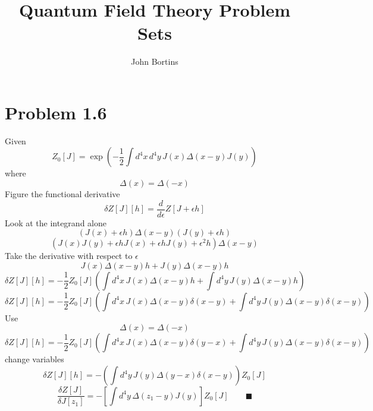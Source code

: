 \documentclass{amsart}
\title{Quantum Field Theory Problem Sets}
\author{John Bortins}
\begin{document}
 
\maketitle{}
 


\section*{Problem 1.6}
Given \[Z_0[J]=\exp\left(-\frac{1}{2}\int d^4 x\, d^4 y\, J(x) \Delta(x-y) J(y)\right)\]
where \[\Delta(x)=\Delta(-x)\]
Figure the functional derivative
\[\delta Z[J][h]=\frac{d}{d\epsilon}Z[J+\epsilon h]\]
Look at the integrand alone
\[(J(x)+\epsilon h) \Delta(x-y) (J(y)+\epsilon h)\]
\[(J(x)J(y)+\epsilon h J(x)+\epsilon h J(y)+\epsilon^2 h) \Delta(x-y)\]
Take the derivative with respect to $\epsilon$
\[J(x) \Delta(x-y)h + J(y) \Delta(x-y)h\]
\[\delta Z[J][h]=-\frac{1}{2}Z_0[J]\left(\int d^4 x\,  J(x) \Delta(x-y)h +\int d^4 y\,J(y) \Delta(x-y)h\right)\]
\[\delta Z[J][h]=-\frac{1}{2}Z_0[J]\left(\int d^4 x\,  J(x) \Delta(x-y)\delta(x-y) +\int d^4 y\,J(y) \Delta(x-y)\delta(x-y)\right)\]
Use \[\Delta(x)=\Delta(-x)\]
\[\delta Z[J][h]=-\frac{1}{2}Z_0[J]\left(\int d^4 x\,  J(x) \Delta(x-y)\delta(y-x) +\int d^4 y\,J(y) \Delta(x-y)\delta(x-y)\right)\] change variables
\[\delta Z[J][h]=-\left(\int d^4 y\,J(y) \Delta(y-x)\delta(x-y)\right)Z_0[J]\]
\[\frac{\delta Z[J]}{\delta J[z_1]}=-\left[\int d^4 y\, \Delta(z_1-y)J(y)\right]Z_0[J] \qquad \blacksquare\]
\end{document}
